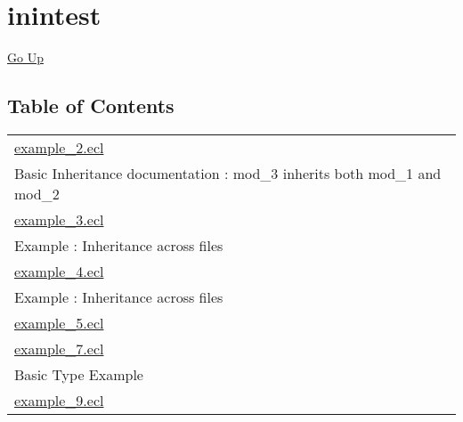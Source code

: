 \chapter*{\color{headtoc} inintest}
\hypertarget{ecldoc:toc:root/intest/inintest}{}
\hyperlink{ecldoc:toc:root/intest}{Go Up}


\section*{Table of Contents}
{\renewcommand{\arraystretch}{1.5}
\begin{longtable}{|p{\textwidth}|}
\hline
\hyperlink{ecldoc:toc:intest.inintest.example_2}{example\_2.ecl} \\
Basic Inheritance documentation : mod\_3 inherits both mod\_1 and mod\_2 \\
\hline
\hyperlink{ecldoc:toc:intest.inintest.example_3}{example\_3.ecl} \\
Example : Inheritance across files \\
\hline
\hyperlink{ecldoc:toc:intest.inintest.example_4}{example\_4.ecl} \\
Example : Inheritance across files \\
\hline
\hyperlink{ecldoc:toc:intest.inintest.example_5}{example\_5.ecl} \\
\hline
\hyperlink{ecldoc:toc:intest.inintest.example_7}{example\_7.ecl} \\
Basic Type Example \\
\hline
\hyperlink{ecldoc:toc:intest.inintest.example_9}{example\_9.ecl} \\
\hline
\end{longtable}
}







